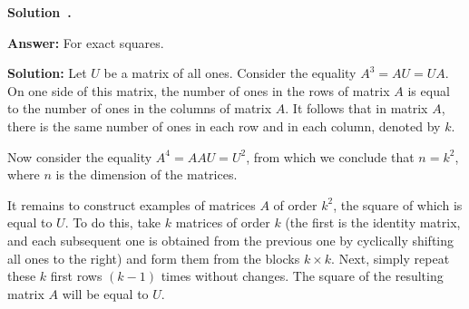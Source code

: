 \documentclass[a4paper,12pt]{article}
\newenvironment{solution}[1][]{%
  \goodbreak\smallskip\par\noindent\textbf{Solution{\if#1\empty\else~#1\fi}.}~}%
{%
  \goodbreak
}
\begin{document}
\begin{solution}

\textbf{Answer:} For exact squares.

\textbf{Solution:} Let \( U \) be a matrix of all ones.
Consider the equality \( A^3 = AU = UA \).
On one side of this matrix, the number of ones in the rows of matrix \( A \) is equal
to the number of ones in the columns of matrix \( A \).
It follows that in matrix \( A \), there is the same number of ones
in each row and in each column, denoted by \( k \).

Now consider the equality \( A^4 = AAU = U^2 \),
from which we conclude that \( n = k^2 \), where \( n \) is the dimension of the matrices.

It remains to construct examples of matrices \( A \) of order \( k^2 \),
the square of which is equal to \( U \). To do this, take \( k \) matrices
of order \( k \) (the first is the identity matrix,
and each subsequent one is obtained from the previous one by cyclically shifting
all ones to the right) and form them from the blocks \( k \times k \).
Next, simply repeat these \( k \) first rows \( (k-1) \) times without changes.
The square of the resulting matrix \( A \) will be equal to \( U \).
\end{solution}

\end{document}
